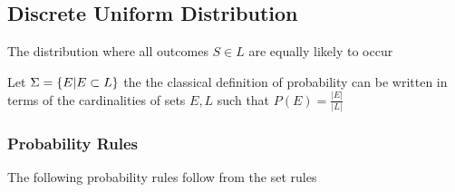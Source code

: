 \subsection{Discrete Uniform Distribution}

	\par{The distribution where all outcomes $S \in L$ are equally likely to
	occur}
	\par{Let $\Sigma = \{E | E \subset L\}$ the the classical definition of
			probability can be written in terms of the cardinalities of sets $E
	, L$ such that $P(E) = \frac{|E|}{|L|}$}

	\subsubsection{Probability Rules}

	\par{The following probability rules follow from the set rules}


